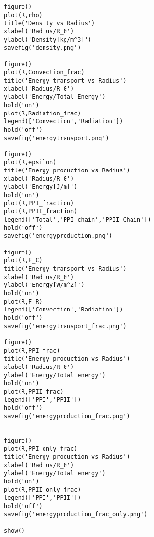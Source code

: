 \documentclass[a4paper,12pt]{article}
\begin{document}
\begin{verbatim}
figure()
plot(R,rho)
title('Density vs Radius')
xlabel('Radius/R_0')
ylabel('Density[kg/m^3]')
savefig('density.png')

figure()
plot(R,Convection_frac)
title('Energy transport vs Radius')
xlabel('Radius/R_0')
ylabel('Energy/Total Energy')
hold('on')
plot(R,Radiation_frac)
legend(['Convection','Radiation'])
hold('off')
savefig('energytransport.png')

figure()
plot(R,epsilon)
title('Energy production vs Radius')
xlabel('Radius/R_0')
ylabel('Energy[J/m]')
hold('on')
plot(R,PPI_fraction)
plot(R,PPII_fraction)
legend(['Total','PPI chain','PPII Chain'])
hold('off')
savefig('energyproduction.png')

figure()
plot(R,F_C)
title('Energy transport vs Radius')
xlabel('Radius/R_0')
ylabel('Energy[W/m^2]')
hold('on')
plot(R,F_R)
legend(['Convection','Radiation'])
hold('off')
savefig('energytransport_frac.png')

figure()
plot(R,PPI_frac)
title('Energy production vs Radius')
xlabel('Radius/R_0')
ylabel('Energy/Total energy')
hold('on')
plot(R,PPII_frac)
legend(['PPI','PPII'])
hold('off')
savefig('energyproduction_frac.png')


figure()
plot(R,PPI_only_frac)
title('Energy production vs Radius')
xlabel('Radius/R_0')
ylabel('Energy/Total energy')
hold('on')
plot(R,PPII_only_frac)
legend(['PPI','PPII'])
hold('off')
savefig('energyproduction_frac_only.png')

show()
\end{verbatim}
\end{document}
